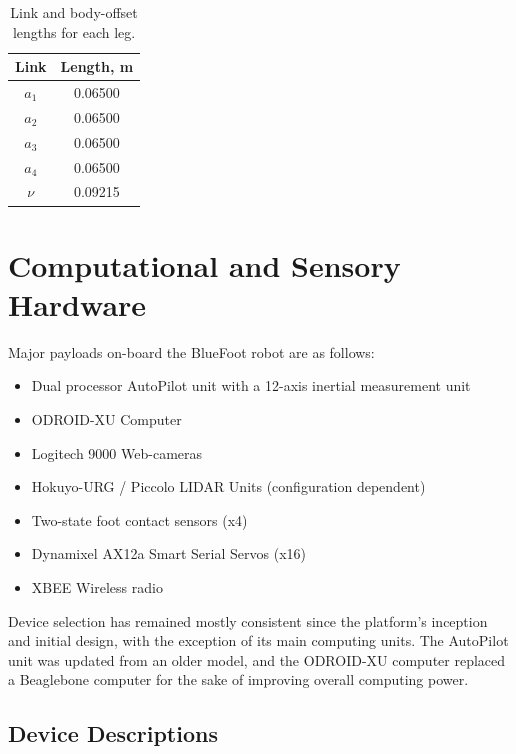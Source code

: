 			\begin{table}[h!]
				\centering
				\begin{tabularx}{\textwidth}{|C{0.5}|C{0.5}|} 	
					\hline
					\bf{Link} 	&	\bf{Length, m}	\\	\hline \hline
					$a_{1}$ 	&	0.06500			\\	\hline
					$a_{2}$		&	0.06500			\\ 	\hline
					$a_{3}$		&	0.06500			\\ 	\hline
					$a_{4}$		&	0.06500			\\ 	\hline
					$\nu$		&	0.09215			\\	\hline
				\end{tabularx} 
				\caption{Link and body-offset lengths for each leg.}
				\label{tab::link_lens}
			\end{table}


	\section{Computational and Sensory Hardware}
		
		\noindent
		Major payloads on-board the BlueFoot robot are as follows: 

			\begin{itemize}
				\item{Dual processor AutoPilot unit with a 12-axis inertial measurement unit}
				\item{ODROID-XU Computer}
				\item{Logitech 9000 Web-cameras}
				\item{Hokuyo-URG / Piccolo LIDAR Units (configuration dependent)}
				\item{Two-state foot contact sensors (x4)}
				\item{Dynamixel AX12a Smart Serial Servos (x16)}
				\item{XBEE Wireless radio}
			\end{itemize}

		Device selection has remained mostly consistent since the platform's inception and initial design, with the exception of its main computing units. The AutoPilot unit was updated from an older model, and the ODROID-XU computer replaced a Beaglebone computer for the sake of improving overall computing power.

		\subsection{Device Descriptions}
	
